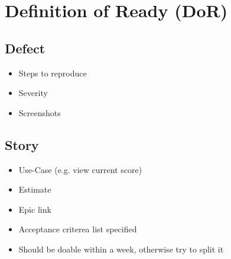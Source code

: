 \section{Definition of Ready (DoR)}

\subsection{Defect} 
\begin{itemize}
    \item Steps to reproduce 
    \item Severity 
    \item Screenshots 
\end{itemize}

\subsection{Story}
\begin{itemize}
    \item Use-Case (e.g. view current score)
    \item Estimate 
    \item Epic link 
    \item Acceptance criterea list specified 
    \item Should be doable within a week, otherwise try to split it 
\end{itemize}
